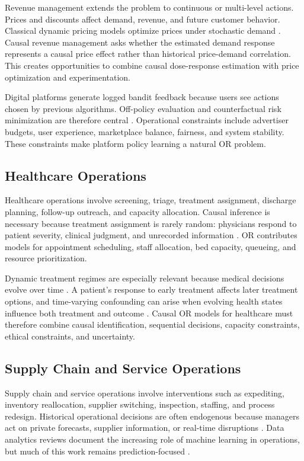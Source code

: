 \documentclass[11pt]{article}
\begin{document}
Revenue management extends the problem to continuous or multi-level actions. Prices and discounts affect demand, revenue, and future customer behavior. Classical dynamic pricing models optimize prices under stochastic demand \citep{gallego1994optimal}. Causal revenue management asks whether the estimated demand response represents a causal price effect rather than historical price-demand correlation. This creates opportunities to combine causal dose-response estimation with price optimization and experimentation.

Digital platforms generate logged bandit feedback because users see actions chosen by previous algorithms. Off-policy evaluation and counterfactual risk minimization are therefore central \citep{dudik2011doubly,swaminathan2015counterfactual}. Operational constraints include advertiser budgets, user experience, marketplace balance, fairness, and system stability. These constraints make platform policy learning a natural OR problem.

\subsection{Healthcare Operations}

Healthcare operations involve screening, triage, treatment assignment, discharge planning, follow-up outreach, and capacity allocation. Causal inference is necessary because treatment assignment is rarely random: physicians respond to patient severity, clinical judgment, and unrecorded information \citep{hernan2020causal,ho2017causal}. OR contributes models for appointment scheduling, staff allocation, bed capacity, queueing, and resource prioritization.

Dynamic treatment regimes are especially relevant because medical decisions evolve over time \citep{murphy2003dynamic,zhang2012robust}. A patient's response to early treatment affects later treatment options, and time-varying confounding can arise when evolving health states influence both treatment and outcome \citep{robins1986new,hernan2020causal}. Causal OR models for healthcare must therefore combine causal identification, sequential decisions, capacity constraints, ethical constraints, and uncertainty.

\subsection{Supply Chain and Service Operations}

Supply chain and service operations involve interventions such as expediting, inventory reallocation, supplier switching, inspection, staffing, and process redesign. Historical operational decisions are often endogenous because managers act on private forecasts, supplier information, or real-time disruptions \citep{ho2017causal}. Data analytics reviews document the increasing role of machine learning in operations, but much of this work remains prediction-focused \citep{choi2018bigdata,misic2020data}.
\end{document}
